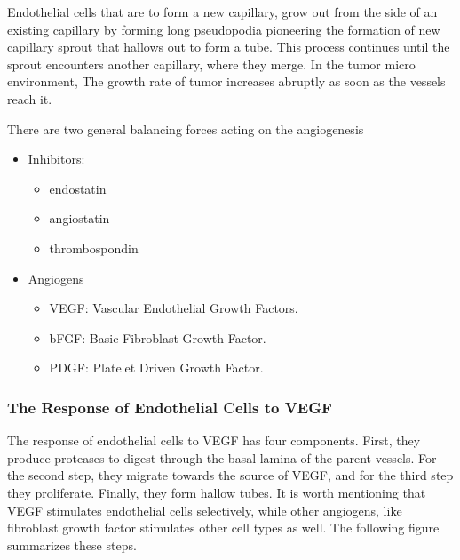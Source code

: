 Endothelial cells that are to form a new capillary, grow out from the side of an existing capillary by forming long pseudopodia pioneering the formation of new capillary sprout that hallows out to form a tube. This process continues until the sprout encounters another capillary, where they merge. In the tumor micro environment, The growth rate of tumor increases abruptly as soon as the vessels reach it. 

There are two general balancing forces acting on the angiogenesis
\begin{itemize}
	\item Inhibitors:
	\begin{itemize}
		\item endostatin
		\item angiostatin
		\item thrombospondin
	\end{itemize} 
	\item Angiogens
	\begin{itemize}
		\item VEGF: Vascular Endothelial Growth Factors.
		\item bFGF: Basic Fibroblast Growth Factor.
		\item PDGF: Platelet Driven Growth Factor.
	\end{itemize}
\end{itemize}
\FloatBarrier


\subsubsection{The Response of Endothelial Cells to VEGF}
The response of endothelial cells to VEGF has four components. First, they produce proteases to digest through the basal lamina of the parent vessels. For the second step, they migrate towards the source of VEGF, and for the third step they proliferate. Finally, they form hallow tubes. It is worth mentioning that VEGF stimulates endothelial cells selectively, while other angiogens, like fibroblast growth factor stimulates other cell types as well. The following figure summarizes these steps.

